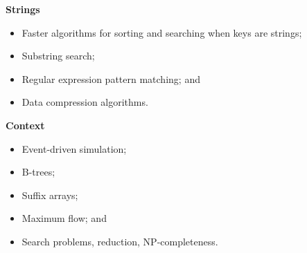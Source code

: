 \documentclass[8pt,a4paper,compress]{beamer}
\begin{document}
\begin{frame}[fragile]
\pause
\textbf{Strings}
\begin{itemize}
\item Faster algorithms for sorting and searching when keys are strings; 
\item Substring search;
\item Regular expression pattern matching; and
\item Data compression algorithms.
\end{itemize}

\pause
\smallskip
\textbf{Context}
\begin{itemize}
\item Event-driven simulation; 
\item B-trees; 
\item Suffix arrays; 
\item Maximum flow; and 
\item Search problems, reduction, NP-completeness.
\end{itemize}
\end{frame}
\end{document}
